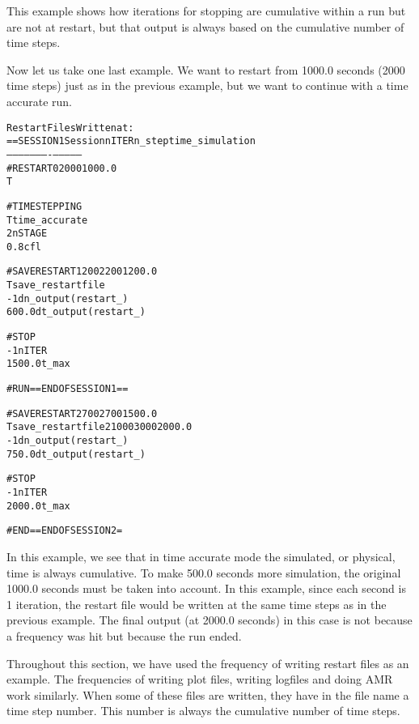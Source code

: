 This example shows how iterations for stopping are cumulative within a run but
are not at restart, but that output is always based on the cumulative number of time steps.

Now let us take one last example.  We want to restart from 1000.0 seconds (2000 time steps)
just as in the previous example, but we want to continue with a time accurate run.
\begin{alltt}
                                             Restart Files Written at:
==SESSION 1      \hfill        Session   nITER   n_step   time_simulation
                 \hfill        --------  ------  -------  --------------
#RESTART                         \hfill            0     2000           1000.0
T

#TIMESTEPPING
T       time_accurate  
2       nSTAGE         
0.8     cfl            

#SAVERESTART                      \hfill  1       200     2200           1200.0
T            save_restartfile
-1           dn_output(restart_)
600.0        dt_output(restart_)

#STOP
-1           nITER
1500.0       t_max

#RUN ==END OF SESSION 1== 

#SAVERESTART                      \hfill  2       700     2700           1500.0
T            save_restartfile	  \hfill  2      1000     3000           2000.0
-1           dn_output(restart_)
750.0        dt_output(restart_)

#STOP
-1           nITER
2000.0       t_max

#END ==END OF SESSION 2 = 
                          
\end{alltt}
In this example, we see that in time accurate mode the simulated, or
physical, time is always cumulative.  To make 500.0 seconds more simulation,
the original 1000.0 seconds must be taken into account.  In this example,
since each second is 1 iteration, the restart file would be written at the
same time steps as in the previous example.  The final output (at 2000.0 seconds)
in this case
is not because a frequency was hit but because
the run ended.

Throughout this section, we have used the frequency of writing restart files
as an example.  The frequencies of writing plot files, writing logfiles and
doing AMR work similarly.
When some of these files are written, they have in the file name a time step
number.  This number is always the cumulative number of time steps.

%








